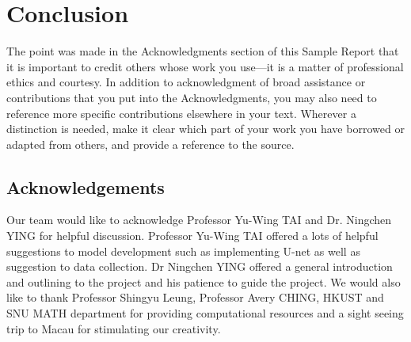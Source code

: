 \chapter{Conclusion}\label{Ch:Conclusion}

The point was made in the Acknowledgments section of this Sample Report that it is important to credit others whose work you use---it is a matter of professional ethics and courtesy. 
In addition to acknowledgment of broad assistance or contributions that you put into the Acknowledgments, you may also need to reference more specific contributions elsewhere in your text.
Wherever a distinction is needed, make it clear which part of your work you have borrowed or adapted from others, and provide a reference to the source. 

\section{Acknowledgements}

Our team would like to acknowledge Professor Yu-Wing TAI and Dr. Ningchen YING for helpful discussion. Professor Yu-Wing TAI offered a lots of helpful suggestions to model development such as implementing U-net as well as suggestion to data collection. Dr Ningchen YING offered a general introduction and outlining to the project and his patience to guide the project. We would also like to thank Professor Shingyu Leung, Professor Avery CHING, HKUST and SNU MATH department for providing computational resources and a sight seeing trip to Macau for stimulating our creativity. 

\endinput
